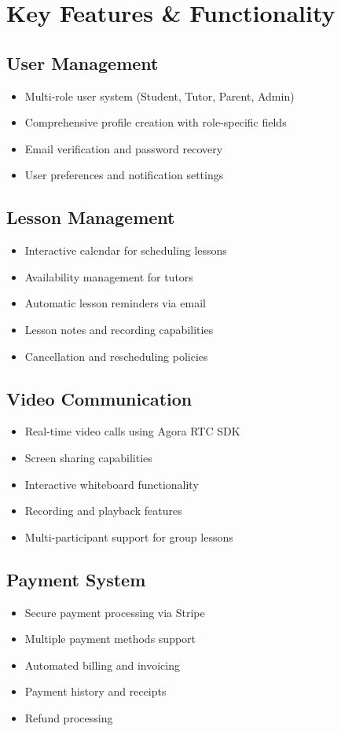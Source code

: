\documentclass[11pt,a4paper]{article}
\begin{document}
\section{Key Features \& Functionality}

\subsection{User Management}
\begin{itemize}
    \item Multi-role user system (Student, Tutor, Parent, Admin)
    \item Comprehensive profile creation with role-specific fields
    \item Email verification and password recovery
    \item User preferences and notification settings
\end{itemize}

\subsection{Lesson Management}
\begin{itemize}
    \item Interactive calendar for scheduling lessons
    \item Availability management for tutors
    \item Automatic lesson reminders via email
    \item Lesson notes and recording capabilities
    \item Cancellation and rescheduling policies
\end{itemize}

\subsection{Video Communication}
\begin{itemize}
    \item Real-time video calls using Agora RTC SDK
    \item Screen sharing capabilities
    \item Interactive whiteboard functionality
    \item Recording and playback features
    \item Multi-participant support for group lessons
\end{itemize}

\subsection{Payment System}
\begin{itemize}
    \item Secure payment processing via Stripe
    \item Multiple payment methods support
    \item Automated billing and invoicing
    \item Payment history and receipts
    \item Refund processing
\end{itemize}
\end{document}

